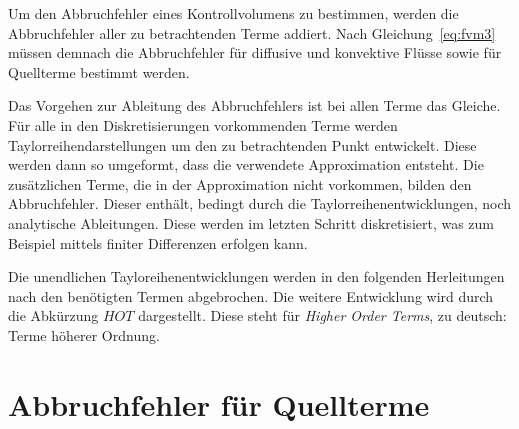 Um den Abbruchfehler eines Kontrollvolumens zu bestimmen, werden die
Abbruchfehler aller zu betrachtenden Terme addiert. Nach Gleichung~\eqref{eq:fvm3}
müssen demnach die Abbruchfehler für diffusive und konvektive Flüsse sowie
für Quellterme bestimmt werden.

Das Vorgehen zur Ableitung des Abbruchfehlers ist bei allen Terme das Gleiche.
Für alle in den Diskretisierungen vorkommenden Terme werden Taylorreihendarstellungen
um den zu betrachtenden Punkt entwickelt. Diese werden dann so umgeformt, dass die
verwendete Approximation entsteht. Die zusätzlichen Terme, die in der Approximation nicht
vorkommen, bilden den Abbruchfehler. Dieser enthält, bedingt durch die Taylorreihenentwicklungen,
noch analytische Ableitungen. Diese werden im letzten Schritt diskretisiert, was zum Beispiel
mittels finiter Differenzen erfolgen kann.

Die unendlichen Tayloreihenentwicklungen werden in den folgenden Herleitungen nach den benötigten
Termen abgebrochen. Die weitere Entwicklung wird durch die Abkürzung $HOT$ dargestellt.
Diese steht für \emph{Higher Order Terms}, zu deutsch: Terme höherer Ordnung.

\section{Abbruchfehler für Quellterme}
\label{sec:Quellterm}

